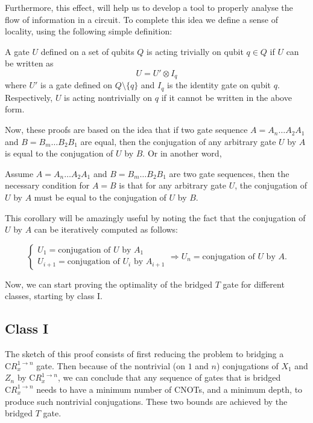 Furthermore, this effect, will help us to develop a tool to properly analyse the flow of information in a circuit. To complete this idea we define a sense of locality, using the following simple definition:

\begin{definition}
  A gate $U$ defined on a set of qubits $Q$ is acting trivially on qubit $q \in Q$ if $U$ can be written as 
  \begin{equation}
    U = U' \otimes I_q
  \end{equation}
  where $U'$ is a gate defined on $Q \setminus \{ q \}$ and $I_q$ is the identity gate on qubit $q$.
  Respectively, $U$ is acting nontrivially on $q$ if it cannot be written in the above form.
\end{definition}

Now, these proofs are based on the idea that if two gate sequence $A = A_n \dots A_2 A_1$ and $B = B_m \dots B_2 B_1$ are equal, then the conjugation of any arbitrary gate $U$ by $A$ is equal to the conjugation of $U$ by $B$. Or in another word,

\begin{corollary}
  Assume $A = A_n \dots A_2 A_1$ and $B = B_m \dots B_2 B_1$ are two gate sequences, then the necessary condition for $A = B$ is that for any arbitrary gate $U$, the conjugation of $U$ by $A$ must be equal to the conjugation of $U$ by $B$.
\end{corollary}

This corollary will be amazingly useful by noting the fact that the conjugation of $U$ by $A$ can be iteratively computed as follows:

\begin{equation}
  \begin{cases}
    U_1 = \text{conjugation of } U \text{ by } A_1 \\
    U_{i+1} = \text{conjugation of } U_i \text{ by } A_{i+1}
  \end{cases}
  \Rightarrow U_n = \text{conjugation of } U \text{ by } A.
\end{equation}

Now, we can start proving the optimality of the bridged $T$ gate for different classes, starting by class I.

\subsection{Class I}

The sketch of this proof consists of first reducing the problem to bridging a $\mathrm{C}R_x^{1\to n}$ gate. Then because of the nontrivial (on $1$ and $n$) conjugations of $X_1$ and $Z_n$ by $\mathrm{C}R_x^{1\to n}$, we can conclude that any sequence of gates that is bridged $\mathrm{C}R_x^{1\to n}$ needs to have a minimum number of CNOTs, and a minimum depth, to produce such nontrivial conjugations. These two bounds are achieved by the bridged $T$ gate.

